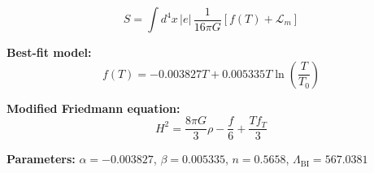 
\begin{equation}
  S = \int d^4x \, |e| \, \frac{1}{16\pi G} \left[ f(T) + \mathcal{L}_m \right]
\end{equation}

\textbf{Best-fit model:}
\begin{equation}
  f(T) = -0.003827 T + 0.005335 T \ln\!\left(\frac{T}{T_0}\right)
\end{equation}

\textbf{Modified Friedmann equation:}
\begin{equation}
  H^2 = \frac{8\pi G}{3} \rho - \frac{f}{6} + \frac{T f_T}{3}
\end{equation}

\textbf{Parameters:}
$\alpha = -0.003827$, \quad
$\beta = 0.005335$, \quad
$n = 0.5658$, \quad
$\Lambda_{\text{BI}} = 567.0381$